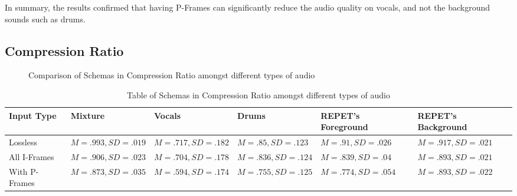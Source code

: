 In summary, the results confirmed that having P-Frames can significantly reduce the audio quality on vocals, and not the background sounds such as drums.

\subsection{Compression Ratio}

\begin{figure}[ht]
  
  \caption{Comparison of Schemas in Compression Ratio amongst different types of audio}
  \label{fig:input-compression}
\end{figure}

\begin{table}[ht]
\centering
\begin{tabularx}{\linewidth}{|X|X|X|X|X|}
\hline
Input Type & Mixture & Vocals & Drums & REPET's Foreground & REPET's Background \\
\hline
Lossless & $M=.993, SD=.019$ & $M=.717, SD=.182$ & $M=.85, SD=.123$ & $M=.91, SD=.026$ & $M=.917, SD=.021$ \\
\hline
All I-Frames & $M=.906, SD=.023$ & $M=.704, SD=.178$ & $M=.836, SD=.124$ & $M=.839, SD=.04$ & $M=.893, SD=.021$ \\
\hline
With P-Frames & $M=.873, SD=.035$ & $M=.594, SD=.174$ & $M=.755, SD=.125$ & $M=.774, SD=.054$ & $M=.893, SD=.022$ \\
\hline
\end{tabularx}
\caption{Table of Schemas in Compression Ratio amongst different types of audio}
\label{tab:input-compression}
\end{table}

